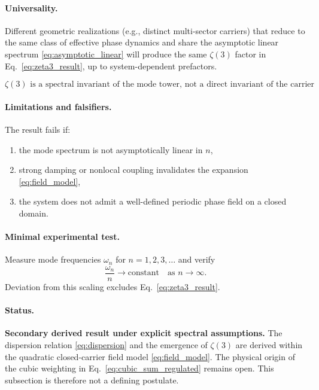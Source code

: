 \documentclass[11pt]{article}
\begin{document}
    \paragraph{Universality.}
        Different geometric realizations (e.g., distinct multi-sector carriers) that reduce to the same class of effective phase dynamics and share the asymptotic linear spectrum \eqref{eq:asymptotic_linear} will produce the same $\zeta(3)$ factor in Eq.~\eqref{eq:zeta3_result}, up to system-dependent prefactors.
        
        \begin{equation}
            \boxed{
                \text{$\zeta(3)$ is a spectral invariant of the mode tower, not a direct invariant of the carrier geometry.}
            }
        \end{equation}

    \paragraph{Limitations and falsifiers.}
        The result fails if:
        \begin{enumerate}
            \item the mode spectrum is not asymptotically linear in $n$,
            \item strong damping or nonlocal coupling invalidates the expansion \eqref{eq:field_model},
            \item the system does not admit a well-defined periodic phase field on a closed domain.
        \end{enumerate}

    \paragraph{Minimal experimental test.}
        Measure mode frequencies $\omega_n$ for $n=1,2,3,\dots$ and verify
        \begin{equation}
            \frac{\omega_n}{n} \to \text{constant}
            \quad\text{as } n\to\infty.
        \end{equation}
        Deviation from this scaling excludes Eq.~\eqref{eq:zeta3_result}.

    \paragraph{Status.}
        \textbf{Secondary derived result under explicit spectral assumptions.} The dispersion relation \eqref{eq:dispersion} and the emergence of \(\zeta(3)\) are derived within the quadratic closed-carrier field model \eqref{eq:field_model}. The physical origin of the cubic weighting in Eq.~\eqref{eq:cubic_sum_regulated} remains open. This subsection is therefore not a defining postulate.
    
\end{document}
